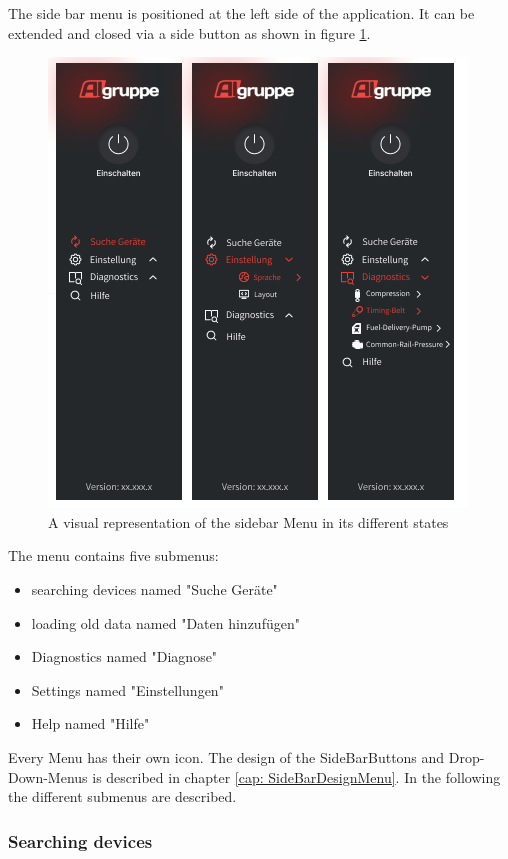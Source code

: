 \documentclass{scrreprt}
\begin{document}
The side bar menu is positioned at the left side of the application. It can be extended and closed via a side button as shown in figure \ref{fig: sidebarMenu}. 
\begin{figure}
    \includegraphics[width=.9\textwidth]{assets/pictures/SideBarMenu.png}
    \caption[]{A visual representation of the sidebar Menu in its different states}
    \label{fig: sidebarMenu}
\end{figure}
The menu contains five submenus:
\begin{itemize}
        \item searching devices named "Suche Geräte"
        \item loading old data named "Daten hinzufügen"
        \item Diagnostics named "Diagnose"
        \item Settings named "Einstellungen"
        \item Help named "Hilfe"
    \end{itemize}
Every Menu has their own icon. The design of the SideBarButtons and Drop-Down-Menus is described in chapter \ref{cap: SideBarDesignMenu}. 
In the following the different submenus are described.

\subsubsection{Searching devices}
\end{document}
